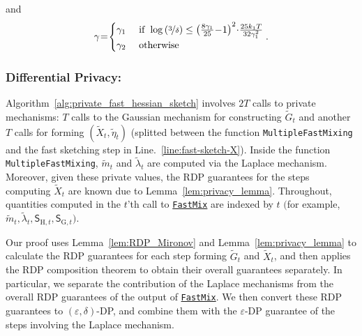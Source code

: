 \documentclass[11pt]{article}
\theoremstyle{definition}
\theoremstyle{plain}
\providecommand{\lemmaref}[1]{Lemma~\ref{#1}}
\providecommand{\algorithmref}[1]{Algorithm~\ref{#1}}
\newcommand{\eps}{{\varepsilon}}
\renewcommand{\eps}{\varepsilon}
\newcommand{\FastMix}{\hyperref[alg:fast_mixing]{\texttt{FastMix}}\xspace}
\begin{document}
and 
\begin{align}
    \gamma \hspace{-0.2em}=\hspace{-0.2em} \begin{cases}
        \gamma_1 \ &\mathrm{if} \ \log\left(\nicefrac{3}{\delta}\right) \leq \left(\frac{8\gamma_1}{25} \hspace{-0.2em}-\hspace{-0.2em} 1\right)^2\hspace{-0.2em}\cdot\hspace{-0.2em} \frac{25k_1T}{32\gamma^2_1}\\
        \gamma_2 \ &\mathrm{otherwise}
    \end{cases}.
\end{align}

\subsubsection{Differential Privacy: }
\label{app:proof_thm_linear_DP}
\algorithmref{alg:private_fast_hessian_sketch} involves $2T$ calls to private mechanisms: $T$ calls to the Gaussian mechanism for constructing $\widetilde{G}_t$ and another $T$ calls for forming $(\widetilde{X}_t, \widetilde{\eta}_t)$ (splitted between the function \texttt{MultipleFastMixing} and the fast sketching step in Line.~\ref{line:fast-sketch-X}). Inside the function \texttt{MultipleFastMixing}, $\widetilde{m}_t$ and $\widetilde{\lambda}_t$ are computed via the Laplace mechanism. Moreover, given these private values, the RDP guarantees for the steps computing $\widetilde{X}_t$ are known due to \lemmaref{lem:privacy_lemma}. Throughout, quantities computed in the $t$'th call to \FastMix are indexed by $t$ $\Big($for example, $\widetilde{m}_t, \widetilde{\lambda}_t, \mathsf{S}_{\mathrm{H}, t}, \mathsf{S}_{\mathrm{G}, t}$$\Big)$.

Our proof uses \lemmaref{lem:RDP_Mironov} and \lemmaref{lem:privacy_lemma} to calculate the RDP guarantees for each step forming $\widetilde{G}_t$ and $\widetilde{X}_t$, and then applies the RDP composition theorem to obtain their overall guarantees separately. In particular, we separate the contribution of the Laplace mechanisms from the overall RDP guarantees of the output of \FastMix. We then convert these RDP guarantees to $(\eps,\delta)$-DP, and combine them with the $\eps$-DP guarantee of the steps involving the Laplace mechanism.
\end{document}
